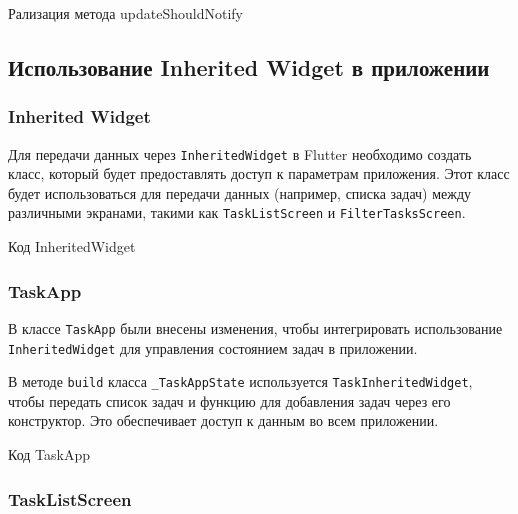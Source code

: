 \begin{image}
	\caption{Рализация метода updateShouldNotify}
	\label{fig:inherited:update}
\end{image}

\subsection{Использование Inherited Widget в приложении}

\subsubsection{Inherited Widget}

Для передачи данных через \texttt{InheritedWidget} 
в Flutter необходимо создать класс,
который будет предоставлять доступ к параметрам приложения.
Этот класс будет использоваться для передачи данных
(например, списка задач) между различными экранами,
такими как \texttt{TaskListScreen} и \texttt{FilterTasksScreen}.

\begin{image}
	\caption{Код InheritedWidget}
	\label{fig:inherited:class}
\end{image}

\subsubsection{TaskApp}

В классе \texttt{TaskApp}  были внесены изменения,
чтобы интегрировать использование \texttt{InheritedWidget}
для управления состоянием задач в приложении.

В методе \texttt{build} класса \texttt{\_TaskAppState}
используется \texttt{TaskInheritedWidget},
чтобы передать список задач и функцию
для добавления задач через его конструктор.
Это обеспечивает доступ к данным во всем приложении.

\begin{image}
	\caption{Код TaskApp}
	\label{fig:inherited:app}
\end{image}

\subsubsection{TaskListScreen}

